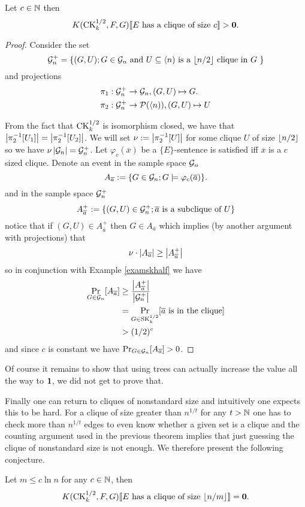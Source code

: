 \begin{thrm}\label{thrmck}
Let $c\in\mathbb{N}$ then 
\[K(\text{CK}_k^{1/2},F,G)\llbracket\text{$E$ has a clique of size $c$}\rrbracket>\textbf{0}.\]
\end{thrm}
\begin{proof}
Consider the set \[\mathcal{G}_n^+=\{(G,U);\text{$G\in \mathcal{G}_n$ and $U\subseteq \langle n)$ is a $\left \lfloor {n/2} \right \rfloor$ clique in $G$ }\}\]
and projections
\begin{align*}
\pi_1:\mathcal{G}_n^+&\to\mathcal{G}_n,(G,U)\mapsto G.\\
\pi_2:\mathcal{G}_n^+&\to\mathcal{P}(\langle n)),(G,U)\mapsto U
\end{align*}

From the fact that $\text{CK}_k^{1/2}$ is isomorphism closed, we have that $\left|{\pi_2^{-1}[U_1]}\right|=\left|{\pi_2^{-1}[U_2]}\right|$. We will set $\nu:=\left|{\pi_2^{-1}[U]}\right|$ for some clique $U$ of size $\left \lfloor {n/2} \right \rfloor$ so we have $\nu\left|{\mathcal{G}_n}\right|=\mathcal{G}_n^+$. Let $\varphi_c(\overline x)$ be a $\{E\}$-sentence is satisfied iff $\overline x$ is a $c$ sized clique.  Denote an event in the sample space $\mathcal{G}_n$
\[A_{\overline a} :=\{G\in\mathcal{G}_n;G\models \varphi_c(\overline a)\}.\]
and in the sample space $\mathcal{G}_n^+$
\[A_{\overline a}^+ :=\{(G,U)\in\mathcal{G}_n^+;\overline a\text{ is a subclique of $U$}\}\]
notice that if $(G,U)\in A_{\overline a}^+$ then $G\in A_{\overline a}$ which implies (by another argument with projections) that
\[\nu\cdot\left|{A_{\overline a}}\right|\geq \left|{A_{\overline a}^+}\right|\]
so in conjunction with Example \ref{examskhalf} we have
\begin{align*}
\Pr_{G\in\mathcal{G}_n}[A_{\overline a}]&\geq \frac{\left|{A_{\overline a}^+}\right|}{\left|{\mathcal{G}_n^+}\right|}\\
&= \Pr_{G\in\text{SK}_{k}^{1/2}}[\overline a \text{ is in the clique}]\\
&>(1/2)^c
\end{align*}
and since $c$ is constant we have $\Pr_{G\in\mathcal{G}_n}[A_{\overline a}]>0$.
\end{proof}

Of course it remains to show that using trees can actually increase the value all the way to $\textbf{1}$, we did not get to prove that.

Finally one can return to cliques of nonstandard size and intuitively one expects this to be hard. For a clique of size greater than $n^{1/t}$ for any $t>\mathbb{N}$ one has to check more than $n^{1/t}$ edges to even know whether a given set is a clique and the counting argument used in the previous theorem implies that just guessing the clique of nonstandard size is not enough. We therefore present the following conjecture.

\begin{conj}
Let $m\leq c \ln n$ for any $c\in\mathbb{N}$, then
\[K(\text{CK}_k^{1/2},F,G)\llbracket\text{$E$ has a clique of size $\left \lfloor {n/m} \right \rfloor$}\rrbracket=\textbf{0}.\]
\end{conj}
